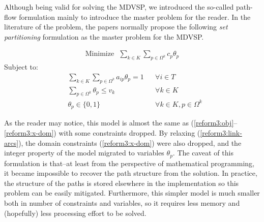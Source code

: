 \documentclass{article}
\begin{document}
Although being valid for solving the MDVSP, we introduced the so-called path-flow formulation mainly to introduce the master problem for the reader. In the literature of the problem, the papers normally propose the following \textit{set partitioning} formulation as the master problem for the MDVSP.

\noindent
\begin{minipage}{\linewidth}
\begin{align}
   \mathrm{Minimize~~~} \sum_{k \in K} \sum_{p \in \Omega^k} c_p \theta_p \label{model:sp:obj}
\end{align}
\qquad Subject to:
\begin{align}
   & \sum_{k \in K} \sum_{p \in \Omega^k} a_{ip} \theta_p = 1 & & \forall i \in T \label{model:sp:assignment}\\
   & \sum_{p \in \Omega^k}  \theta_p \leqslant v_k & & \forall k \in K \label{model:sp:depot-cap}\\
   & \theta_p \in \{0, 1\} & & \forall k \in K, p \in \Omega^k \label{model:sp:domain}
\end{align}
\end{minipage}

\vspace{12pt}

As the reader may notice, this model is almost the same as (\ref{reform3:obj}--\ref{reform3:x-dom}) with some constraints dropped. By relaxing (\ref{reform3:link-arcs}), the domain constraints (\ref{reform3:x-dom}) were also dropped, and the integer property of the model migrated to variables $\theta_p$. The caveat of this formulation is that--at least from the perspective of mathematical programming, it became impossible to recover the path structure from the solution. In practice, the structure of the paths is stored elsewhere in the implementation so this problem can be easily mitigated. Furthermore, this simpler model is much smaller both in number of constraints and variables, so it requires less memory and (hopefully) less processing effort to be solved.
\end{document}
